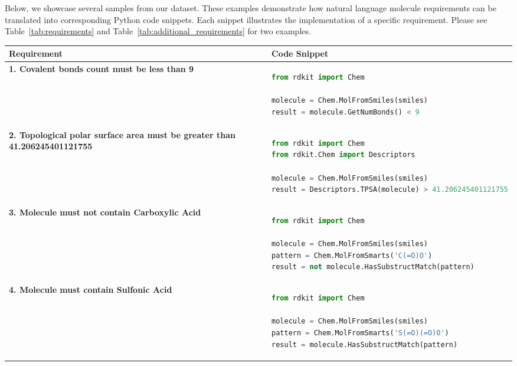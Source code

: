 \documentclass[10pt]{article} %
\begin{document}
    Below, we showcase several samples from our dataset. These examples demonstrate how natural language molecule requirements can be translated into corresponding Python code snippets. Each snippet illustrates the implementation of a specific requirement. Please see Table~\ref{tab:requirements} and Table~\ref{tab:additional_requirements} for two examples.

    \begin{table}[H]
        \centering
        \small
        \begin{tabular}{|p{}|p{}|}
            \hline
            \textbf{Requirement} & \textbf{Code Snippet} \\
            \hline
            \textbf{1. Covalent bonds count must be less than 9} &
            \begin{lstlisting}[language=Python]
from rdkit import Chem

molecule = Chem.MolFromSmiles(smiles)
result = molecule.GetNumBonds() < 9
            \end{lstlisting} \\
            \hline

            \textbf{2. Topological polar surface area must be greater than 41.206245401121755} &
            \begin{lstlisting}[language=Python]
from rdkit import Chem
from rdkit.Chem import Descriptors

molecule = Chem.MolFromSmiles(smiles)
result = Descriptors.TPSA(molecule) > 41.206245401121755
            \end{lstlisting} \\
            \hline

            \textbf{3. Molecule must not contain Carboxylic Acid} &
            \begin{lstlisting}[language=Python]
from rdkit import Chem

molecule = Chem.MolFromSmiles(smiles)
pattern = Chem.MolFromSmarts('C(=O)O')
result = not molecule.HasSubstructMatch(pattern)
            \end{lstlisting} \\
            \hline

            \textbf{4. Molecule must contain Sulfonic Acid} &
            \begin{lstlisting}[language=Python]
from rdkit import Chem

molecule = Chem.MolFromSmiles(smiles)
pattern = Chem.MolFromSmarts('S(=O)(=O)O')
result = molecule.HasSubstructMatch(pattern)
            \end{lstlisting} \\
            \hline


\end{tabular}
\end{table}
\end{document}
